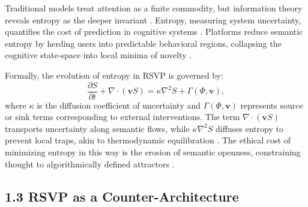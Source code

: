 \documentclass[12pt]{article}
\begin{document}
Traditional models treat attention as a finite commodity, but information theory reveals entropy as the deeper invariant \citep{cover2006}. Entropy, measuring system uncertainty, quantifies the cost of prediction in cognitive systems \citep{shannon1948}. Platforms reduce semantic entropy by herding users into predictable behavioral regions, collapsing the cognitive state-space into local minima of novelty \citep{jaynes2003}.

Formally, the evolution of entropy in RSVP is governed by:
\[
\frac{\partial S}{\partial t} + \nabla \cdot (\mathbf{v} S) = \kappa \nabla^2 S + \Gamma(\Phi, \mathbf{v}),
\]
where \(\kappa\) is the diffusion coefficient of uncertainty and \(\Gamma(\Phi, \mathbf{v})\) represents source or sink terms corresponding to external interventions. The term \(\nabla \cdot (\mathbf{v} S)\) transports uncertainty along semantic flows, while \(\kappa \nabla^2 S\) diffuses entropy to prevent local traps, akin to thermodynamic equilibration \citep{jaynes2003}. The ethical cost of minimizing entropy in this way is the erosion of semantic openness, constraining thought to algorithmically defined attractors \citep{deleuze1987}.

\subsection{1.3 RSVP as a Counter-Architecture}
\end{document}
